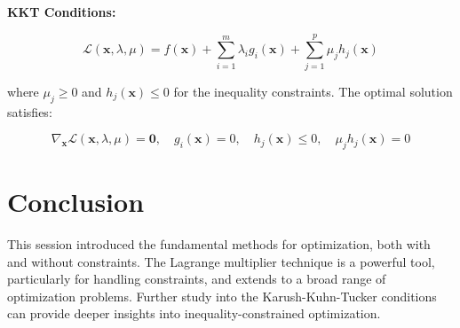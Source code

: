\documentclass[]{article}
\begin{document}
	\textbf{KKT Conditions:}
	
	\[
	\mathcal{L}(\mathbf{x}, \lambda, \mu) = f(\mathbf{x}) + \sum_{i=1}^m \lambda_i g_i(\mathbf{x}) + \sum_{j=1}^p \mu_j h_j(\mathbf{x})
	\]
	
	where \( \mu_j \geq 0 \) and \( h_j(\mathbf{x}) \leq 0 \) for the inequality constraints. The optimal solution satisfies:
	
	\[
	\nabla_\mathbf{x} \mathcal{L}(\mathbf{x}, \lambda, \mu) = \mathbf{0}, \quad g_i(\mathbf{x}) = 0, \quad h_j(\mathbf{x}) \leq 0, \quad \mu_j h_j(\mathbf{x}) = 0
	\]
	
	\section{Conclusion}
	This session introduced the fundamental methods for optimization, both with and without constraints. The Lagrange multiplier technique is a powerful tool, particularly for handling constraints, and extends to a broad range of optimization problems. Further study into the Karush-Kuhn-Tucker conditions can provide deeper insights into inequality-constrained optimization.
	
	
	
\end{document}

